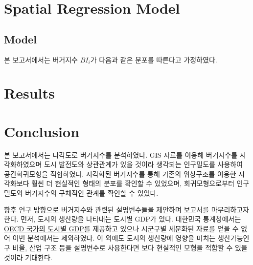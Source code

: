 \documentclass{scrartcl}
\begin{document}
\section{Spatial Regression Model}\label{sec:sreg}

\subsection{Model}\label{subsec:sreg:model}

본 보고서에서는 버거지수 $BI_i$가 다음과 같은 분포를 따른다고 가정하였다.


\section{Results}\label{sec:result}


\section{Conclusion}\label{sec:con}

본 보고서에서는 다각도로 버거지수를 분석하였다. GIS 자료를 이용해 버거지수를 시각화하였으며 도시 발전도와 상관관계가 있을 것이라 생각되는 인구밀도를 사용하여 공간회귀모형을 적합하였다. 시각화된 버거지수를 통해 기존의 위상구조를 이용한 시각화보다 훨씬 더 현실적인 형태의 분포를 확인할 수 있었으며, 회귀모형으로부터 인구밀도와 버거지수의 구체적인 관계를 확인할 수 있었다. 

향후 연구 방향으로 버거지수와 관련된 설명변수들을 제안하며 보고서를 마무리하고자 한다. 먼저, 도시의 생산량을 나타내는 도시별 GDP가 있다. 대한민국 통계청에서는 \href{http://kosis.kr/statHtml/statHtml.do?orgId=101&tblId=DT\_2KAA912\_OECD}{OECD 국가의 도시별 GDP}를 제공하고 있으나 시군구별 세분화된 자료를 얻을 수 없어 이번 분석에서는 제외하였다. 이 외에도 도시의 생산량에 영향을 미치는 생산가능인구 비율, 산업 구조 등을 설명변수로 사용한다면 보다 현실적인 모형을 적합할 수 있을 것이라 기대한다.


\end{document}
